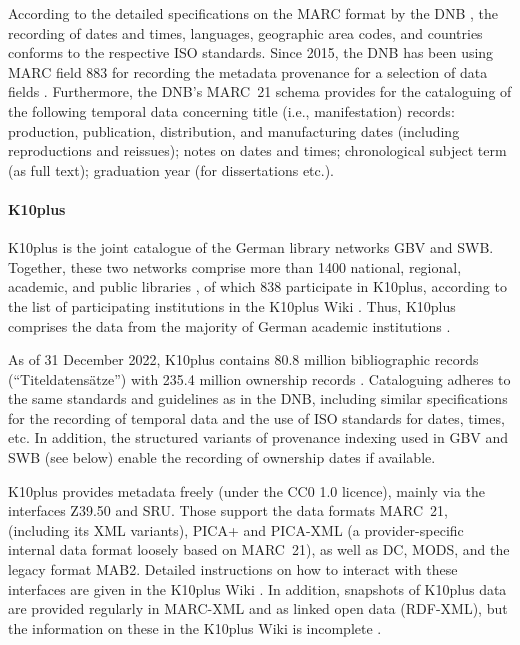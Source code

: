 According to the detailed specifications on the \gls{MARC} format by the DNB
\autocite{DNB_MARC21,DNB_MARCXML}, the recording of dates and times, languages,
geographic area codes, and countries conforms to the respective \gls{ISO} standards.
Since 2015, the DNB has been using \gls{MARC} field 883
for recording the metadata provenance for a selection of data fields
\autocite{DNBwiki_MARC_883}.
Furthermore, the DNB's MARC~21 schema provides for the cataloguing of the following temporal data concerning
title (i.e., manifestation) records: production, publication, distribution, and manufacturing dates
(including reproductions and reissues); notes on dates and times;
chronological subject term (as full text); graduation year (for dissertations etc.).

\paragraph{K10plus}

%
%
\gls{K10plus} is the joint catalogue of the German library networks \gls{GBV} and \gls{SWB}.
Together, these two networks comprise more than 1400 national, regional,
academic, and public libraries \autocite{BSZGBV,GBV_VZG},
of which 838 participate in K10plus, according to the list of participating institutions
in the K10plus Wiki \autocite{K10plusWiki}. Thus, K10plus comprises the data from
the majority of German academic institutions \autocite[cf.][]{BSZ_K10plus}.

As of 31 December 2022, K10plus contains 80.8 million bibliographic records (\enquote{Titeldatensätze})
with 235.4 million ownership records \autocite{GBV_K10plus_Statistik}.
Cataloguing adheres to the same standards and guidelines as in the DNB,
including similar specifications for the recording of temporal data and the use of ISO standards for dates, times, etc.
In addition, the structured variants of provenance indexing used in \gls{GBV} and \gls{SWB}
(see below) enable the recording of ownership dates if available.

K10plus provides metadata freely (under the CC0 1.0 licence),
mainly via the interfaces \gls{Z39.50} and \gls{SRU}.
Those support the data formats \gls{MARC}~21, (including its XML variants),
PICA+ and PICA-XML (a provider-specific internal data format loosely based on MARC~21),
as well as \gls{DC}, \gls{MODS}, and the legacy format \gls{MAB}2.
Detailed instructions on how to interact with these interfaces
are given in the K10plus Wiki \autocite{K10plusWiki}.
In addition, snapshots of K10plus data are provided regularly
in \gls{MARC}-XML and as linked open data (\gls{RDF}-XML), but the information
on these in the K10plus Wiki is incomplete \autocite{K10plusWikiOD}.

